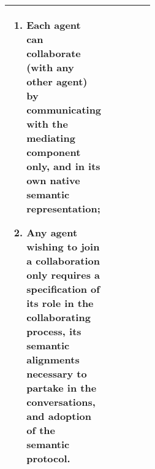 \begin{xltabular}[l]{\linewidth}{@{} >{\small\raggedright\arraybackslash}p{0.47\linewidth} >{\small\raggedright\arraybackslash}X @{}}
\begin{enumerate}[left=10pt, nosep]
  \item Each agent can collaborate (with any other agent) by communicating with the mediating component only, and in its own native semantic representation;
  \item Any agent wishing to join a collaboration only requires a specification of its role in the collaborating process, its semantic alignments necessary to partake in the conversations, and adoption of the semantic protocol.
\end{enumerate}\\
%
\bottomrule
\end{xltabular}


